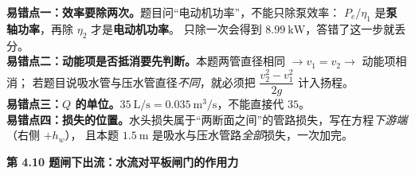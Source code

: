 \begin{yicuo}
\textbf{易错点一：效率要除两次。}题目问“电动机功率”，不能只除泵效率：
$P_e/\eta_1$ 是\textbf{泵轴功率}，再除 $\eta_2$ 才是\textbf{电动机功率}。
只除一次会得到 $8.99\ \mathrm{kW}$，答错了这一步就丢分。\\
\textbf{易错点二：动能项是否抵消要先判断。}本题两管直径相同 $\to v_1=v_2\to$ 动能项相消；
若题目说吸水管与压水管直径\emph{不同}，就必须把 $\dfrac{v_2^2-v_1^2}{2g}$ 计入扬程。\\
\textbf{易错点三：$Q$ 的单位。}$35\ \mathrm{L/s}=0.035\ \mathrm{m^3/s}$，不能直接代 $35$。\\
\textbf{易错点四：损失的位置。}水头损失属于“两断面之间”的管路损失，写在方程\emph{下游端}（右侧 $+h_w$），
且本题 $1.5\ \mathrm{m}$ 是吸水与压水管路\emph{全部}损失，一次加完。
\end{yicuo}

\noindent\textbf{第 4.10 题\quad 闸下出流：水流对平板闸门的作用力}

